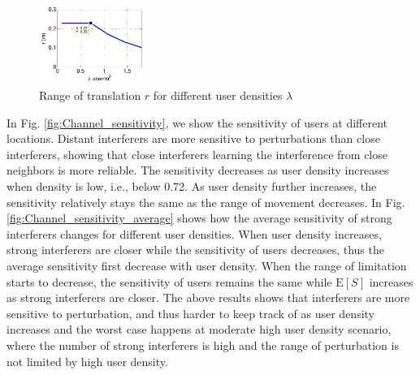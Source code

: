 \documentclass[10pt, conference, letterpaper]{IEEEtran}
\begin{document}
\begin{figure}
	\centering
	\includegraphics[width = 0.3\textwidth]{Channel_translation_range.pdf}
	\caption{Range of translation $r$ for different user densities $\lambda$}
	\label{fig:Channel_translation_range}
\end{figure}

In Fig. \ref{fig:Channel_sensitivity}, we show the sensitivity of users at different locations. Distant interferers are more sensitive to perturbations than close interferers, showing that close interferers learning the interference from close neighbors is more reliable. The sensitivity decreases as user density increases when density is low, i.e., below 0.72. As user density further increases, the sensitivity relatively stays the same as the range of movement decreases. In Fig. \ref{fig:Channel_sensitivity_average} shows how the average sensitivity of strong interferers changes for different user densities. When user density increases, strong interferers are closer while the sensitivity of users decreases, thus the average sensitivity first decrease with user density. When the range of limitation starts to decrease, the sensitivity of users remains the same while $\mathrm{E}[S]$ increases as strong interferers are closer. The above results shows that interferers are more sensitive to perturbation, and thus harder to keep track of as user density increases and the worst case happens at moderate high user density scenario, where the number of strong interferers is high and the range of perturbation is not limited by high user density. 
\end{document}
